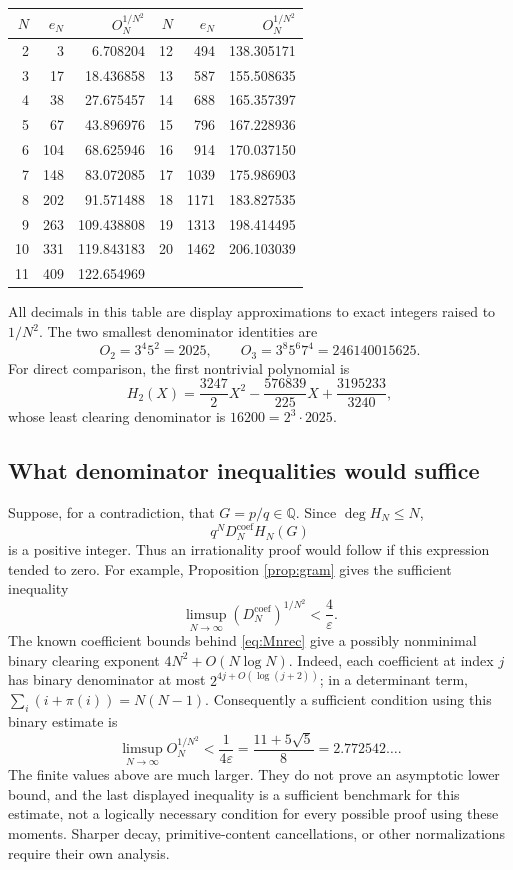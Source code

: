 \documentclass[11pt,a4paper]{article}
\theoremstyle{definition}\newtheorem{definition}[theorem]{Definition}
\theoremstyle{remark}\newtheorem{remark}[theorem]{Remark}
\newcommand{\Q}{\mathbb Q}\newcommand{\Z}{\mathbb Z}\newcommand{\N}{\mathbb N}\newcommand{\R}{\mathbb R}\newcommand{\C}{\mathbb C}
\begin{document}
\begin{center}
\begin{tabular}{rrrrrr}
\toprule
$N$ & $e_N$ & $O_N^{1/N^2}$ & $N$ & $e_N$ & $O_N^{1/N^2}$\\
\midrule
2&3&6.708204&12&494&138.305171\\
3&17&18.436858&13&587&155.508635\\
4&38&27.675457&14&688&165.357397\\
5&67&43.896976&15&796&167.228936\\
6&104&68.625946&16&914&170.037150\\
7&148&83.072085&17&1039&175.986903\\
8&202&91.571488&18&1171&183.827535\\
9&263&109.438808&19&1313&198.414495\\
10&331&119.843183&20&1462&206.103039\\
11&409&122.654969&&&\\
\bottomrule
\end{tabular}
\end{center}
All decimals in this table are display approximations to exact integers raised to $1/N^2$. The two smallest denominator identities are
\[
 O_2=3^4 5^2=2025,\qquad O_3=3^8 5^6 7^4=246140015625.
\]
For direct comparison, the first nontrivial polynomial is
\[
 H_2(X)=\frac{3247}{2}X^2-\frac{576839}{225}X+\frac{3195233}{3240},
\]
whose least clearing denominator is $16200=2^3\cdot2025$.

\subsection{What denominator inequalities would suffice}
Suppose, for a contradiction, that $G=p/q\in\Q$. Since $\deg H_N\le N$,
\[
 q^N D_N^{\mathrm{coef}}H_N(G)
\]
is a positive integer. Thus an irrationality proof would follow if this expression tended to zero. For example, Proposition \ref{prop:gram} gives the sufficient inequality
\[
 \limsup_{N\to\infty}(D_N^{\mathrm{coef}})^{1/N^2}<\frac4\varepsilon.
\]
The known coefficient bounds behind \eqref{eq:Mnrec} give a possibly nonminimal binary clearing exponent $4N^2+O(N\log N)$. Indeed, each coefficient at index $j$ has binary denominator at most $2^{4j+O(\log(j+2))}$; in a determinant term, $\sum_i(i+\pi(i))=N(N-1)$. Consequently a sufficient condition using this binary estimate is
\[
 \limsup_{N\to\infty}O_N^{1/N^2}<\frac1{4\varepsilon}
 =\frac{11+5\sqrt5}{8}=2.772542\ldots.
\]
The finite values above are much larger. They do not prove an asymptotic lower bound, and the last displayed inequality is a sufficient benchmark for this estimate, not a logically necessary condition for every possible proof using these moments. Sharper decay, primitive-content cancellations, or other normalizations require their own analysis.
\end{document}

